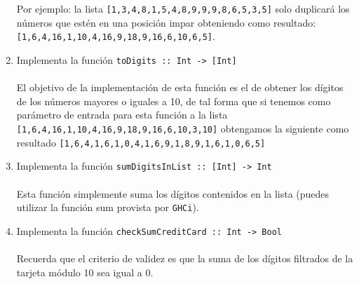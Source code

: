 \begin{exercise}
\begin{enumerate}
                  Por ejemplo: la lista \texttt{[1,3,4,8,1,5,4,8,9,9,9,8,6,5,3,5]} solo duplicará los números que estén en una posición impar obteniendo como resultado: \texttt{[1,6,4,16,1,10,4,16,9,18,9,16,6,10,6,5]}. \\
           \item  Implementa la función \texttt{toDigits :: Int ->\ [Int]}\\\\
                  El objetivo de la implementación de esta función es el de obtener los dígitos de los números mayores o iguales a 10, de tal forma que si tenemos como parámetro de entrada para esta función a la lista \texttt{[1,6,4,16,1,10,4,16,9,18,9,16,6,10,3,10]} obtengamos la siguiente como resultado \texttt{[1,6,4,1,6,1,0,4,1,6,9,1,8,9,1,6,1,0,6,5]} \\
           \item  Implementa la función \texttt{sumDigitsInList :: [Int] ->\ Int} \\\\
                  Esta función simplemente suma los dígitos contenidos en la lista (puedes utilizar la función sum provista por \texttt{GHCi}).\\
           \item  Implementa la función \texttt{checkSumCreditCard :: Int ->\ Bool}\\\\
                  Recuerda que el criterio de validez es que la suma de los dígitos filtrados de la tarjeta módulo 10 sea igual a 0.
                    
        \end{enumerate}    
    \end{exercise}

